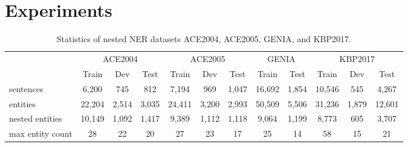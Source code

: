 \documentclass[11pt]{article}
\begin{document}
\section{Experiments}

\begin{table*}[t]
    \small 
    \centering
    \begin{tabular}{lccccccccccc}
    \toprule
       & \multicolumn{3}{c}{ACE2004} & \multicolumn{3}{c}{ACE2005} & \multicolumn{2}{c}{GENIA} & \multicolumn{3}{c}{KBP2017} \\
       & Train & Dev & Test & Train & Dev & Test & Train & Test & Train & Dev & Test \\
    \midrule
     sentences & 6,200 & 745 & 812 & 7,194 & 969 & 1,047 & 16,692 & 1,854 & 10,546 & 545 & 4,267\\
 entities & 22,204 & 2,514 & 3,035 & 24,411 & 3,200 & 2,993 & 50,509 & 5,506 & 31,236 & 1,879 & 12,601 \\
     nested entities & 10,149 & 1,092 & 1,417 & 9,389 & 1,112 & 1,118 & 9,064 & 1,199 & 8,773 & 605 & 3,707 \\
max entity count & 28 & 22 & 20 & 27 & 23 & 17 & 25 & 14 & 58 & 15 & 21 \\
    \bottomrule
    \end{tabular}
    \caption{Statistics of nested NER datasets ACE2004, ACE2005, GENIA, and KBP2017.}
    \label{dataset}
\end{table*}
\end{document}
